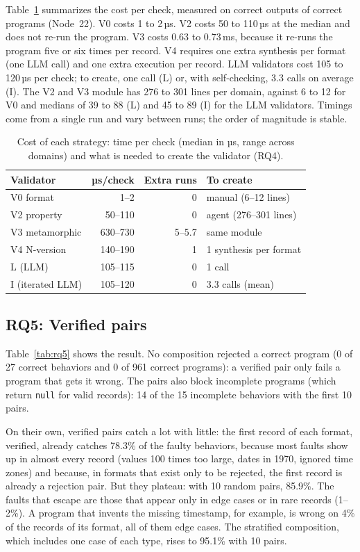 \documentclass[sigconf,nonacm]{acmart}
\begin{document}
Table~\ref{tab:rq4} summarizes the cost per check, measured on correct outputs of correct programs (Node~22). V0 costs 1 to 2\,µs. V2 costs 50 to 110\,µs at the median and does not re-run the program. V3 costs 0.63 to 0.73\,ms, because it re-runs the program five or six times per record. V4 requires one extra synthesis per format (one LLM call) and one extra execution per record. LLM validators cost 105 to 120\,µs per check; to create, one call (L) or, with self-checking, 3.3 calls on average (I). The V2 and V3 module has 276 to 301 lines per domain, against 6 to 12 for V0 and medians of 39 to 88 (L) and 45 to 89 (I) for the LLM validators. Timings come from a single run and vary between runs; the order of magnitude is stable.

\begin{table}[t]
\caption{Cost of each strategy: time per check (median in µs, range across domains) and what is needed to create the validator (RQ4).}
\label{tab:rq4}
\small
\begin{tabular}{lrrl}
\toprule
Validator & µs/check & Extra runs & To create \\
\midrule
V0 format & 1--2 & 0 & manual (6--12 lines) \\
V2 property & 50--110 & 0 & agent (276--301 lines) \\
V3 metamorphic & 630--730 & 5--5.7 & same module \\
V4 N-version & 140--190 & 1 & 1 synthesis per format \\
L (LLM) & 105--115 & 0 & 1 call \\
I (iterated LLM) & 105--120 & 0 & 3.3 calls (mean) \\
\bottomrule
\end{tabular}
\end{table}

\subsection{RQ5: Verified pairs}
\label{sec:rq5}

Table~\ref{tab:rq5} shows the result. No composition rejected a correct program (0 of 27 correct behaviors and 0 of 961 correct programs): a verified pair only fails a program that gets it wrong. The pairs also block incomplete programs (which return \texttt{null} for valid records): 14 of the 15 incomplete behaviors with the first 10 pairs.

On their own, verified pairs catch a lot with little: the first record of each format, verified, already catches 78.3\% of the faulty behaviors, because most faults show up in almost every record (values 100 times too large, dates in 1970, ignored time zones) and because, in formats that exist only to be rejected, the first record is already a rejection pair. But they plateau: with 10 random pairs, 85.9\%. The faults that escape are those that appear only in edge cases or in rare records (1--2\%). A program that invents the missing timestamp, for example, is wrong on 4\% of the records of its format, all of them edge cases. The stratified composition, which includes one case of each type, rises to 95.1\% with 10 pairs.
\end{document}
